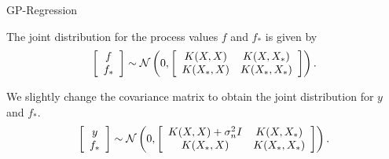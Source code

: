 
% 	

	







\begin{frame}{GP-Regression}

	The joint distribution for the process values $f$ and $f_*$ is given by
	$$\left [ \begin{array}{c} f\\ f_* \end{array} \right ]
	\sim
	\mathcal{N} \left ( 0, \left [\begin{array}{cc} K(X, X) & K(X, X_*)\\ K(X_*, X) & K(X_*, X_*) \end{array} \right] \right ).
	$$

	We slightly change the covariance matrix to obtain the joint distribution for $y$ and $f_*$.
	$$\left [ \begin{array}{c} y\\ f_* \end{array} \right ]
	\sim
	\mathcal{N} \left ( 0, \left [\begin{array}{cc} K(X, X) + \sigma_n^2 I & K(X, X_*)\\ K(X_*, X) & K(X_*, X_*) \end{array} \right] \right ).
	$$
\end{frame}


